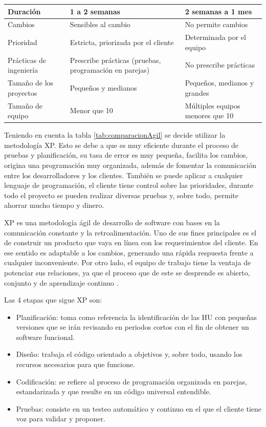 {\begin{longtable}{|p{4cm}|p{5.5cm}|p{5.5cm}|}
    	\hline
    	Duración & 1 a 2 semanas & 2 semanas a 1 mes \\ 
    	\hline
    	\rowcolor[HTML]{EDEBF1}
    	Cambios & Sensibles al cambio & No permite cambios \\ 
    	\hline
    	Prioridad & Estricta, priorizada por el cliente & Determinada por el equipo \\ 
    	\hline
    	\rowcolor[HTML]{EDEBF1}
    	Prácticas de ingeniería & Prescribe prácticas (pruebas, programación en parejas) & No prescribe prácticas \\ 
    	\hline
    	Tamaño de los proyectos & Pequeños y medianos & Pequeños, medianos y grandes \\ 
    	\hline
    	\rowcolor[HTML]{EDEBF1}
    	Tamaño de equipo & Menor que 10 & Múltiples equipos menores que 10 \\ 
    	\hline
    \end{longtable}
    
    
    
    Teniendo en cuenta la tabla \ref{tab:comparacionAgil} se decide utilizar la metodología \ac{XP}. Esto se debe a que es muy eficiente durante el proceso de pruebas y planificación, su tasa de error es muy pequeña, facilita los cambios, origina una programación muy organizada, además de fomentar la comunicación entre los desarrolladores y los clientes. También se puede aplicar a cualquier lenguaje de programación, el cliente tiene control sobre las prioridades, durante todo el proyecto se pueden realizar diversas pruebas y, sobre todo, permite ahorrar mucho tiempo y dinero.
    
    
    \ac{XP} es una metodología ágil de desarrollo de software con bases en la comunicación constante y la retroalimentación. Uno de sus fines principales es el de construir un producto que vaya en línea con los requerimientos del cliente. En ese sentido es adaptable a los cambios, generando una rápida respuesta frente a cualquier inconveniente. Por otro lado, el equipo de trabajo tiene la ventaja de potenciar sus relaciones, ya que el proceso que de este se desprende es abierto, conjunto y de aprendizaje continuo \citep{pressman2014se}. 
    
    Las 4 etapas que sigue \ac{XP} son:  
    \begin{itemize}
    	\item Planificación: toma como referencia la identificación de las \ac{HU} con pequeñas versiones que se irán revisando en periodos cortos con el fin de obtener un software funcional.
    	\item Diseño: trabaja el código orientado a objetivos y, sobre todo, usando los recursos necesarios para que funcione. 
    	\item Codificación: se refiere al proceso de programación organizada en parejas, estandarizada y que resulte en un código universal entendible. 
    	\item Pruebas: consiste en un testeo automático y continuo en el que el cliente tiene voz para validar y proponer.
    \end{itemize}
    
}
